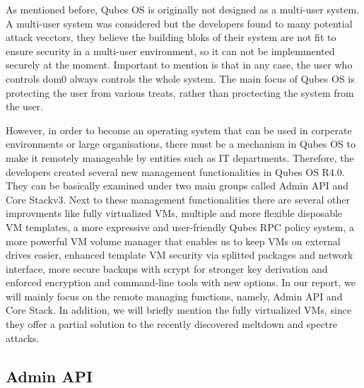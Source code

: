 \documentclass[runningheads,a4paper]{article}
\begin{document}
As mentioned before, Qubes OS is originally
not designed as a multi-user system.  A multi-user system was
considered but the developers found to many potential attack vecctors,
they believe the building bloks of their system are not fit to ensure
security in a multi-user environment, so it can not be implemmented
securely at the moment. Important to mention is that in any case, the
user who controls dom0 always controls the whole system. The main
focus of Qubes OS is protecting the user from various treats, rather
than proctecting the system from the user.

However, in order to become an operating system that can be used in
corperate environments or large organisations, there must be a
mechanism in Qubes OS to make it remotely manageable by entities such
as IT departments.  Therefore, the developers created several new
management functionalities in Qubes OS R4.0. They can be basically
examined under two main groups called Admin API and Core Stackv3. Next
to these management functionalities there are several other
improvments like fully virtualized VMs, multiple and more flexible
disposable VM templates, a more expressive and user-friendly Qubes RPC
policy system, a more powerful VM volume manager that enables us to
keep VMs on external drives easier, enhanced template VM security via
splitted packages and network interface, more secure backups with
scrypt for stronger key derivation and enforced encryption and
command-line tools with new options. In our report, we will mainly
focus on the remote managing functions, namely, Admin API and Core
Stack. In addition, we will briefly mention the fully virtualized VMs,
since they offer a partial solution to the recently discovered
meltdown and spectre attacks.

\subsection{Admin API} 
\end{document}
